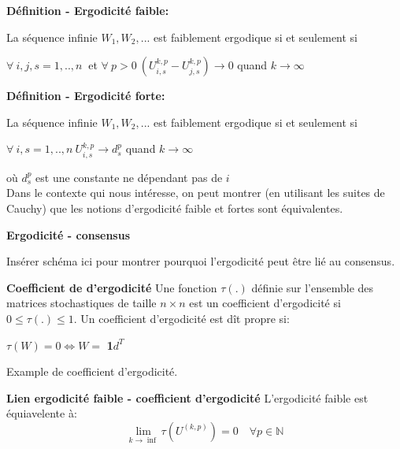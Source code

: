 \documentclass{beamer}
\begin{document}
\begin{frame}
	\textbf{Définition - Ergodicité faible:}
	
	La séquence infinie $W_1, W_2, ...$ est faiblement ergodique si et seulement si
	
	$ \forall\ i, j, s = 1,..,n\ $ et $\forall\ p > 0\ (U_{i,s}^{k,p} - U_{j,s}^{k,p}) \rightarrow 0$ quand $k \rightarrow \infty$
	
	\bigbreak

	\pause
	
	\textbf{Définition - Ergodicité forte:}
	
	La séquence infinie $W_1, W_2, ...$ est faiblement ergodique si et seulement si
	
	$ \forall\ i, s = 1,..,n\ U_{i,s}^{k,p} \rightarrow d_s^p$ quand $k \rightarrow \infty$
	
	où $d_s^p$ est une constante ne dépendant pas de $i$
	\\ 
	\vspace{1cm}
	\pause
	Dans le contexte qui nous intéresse, on peut montrer (en utilisant les suites de Cauchy) 
	que les notions d'ergodicité faible et fortes sont équivalentes.
	
\end{frame}


\begin{frame}
	\textbf{Ergodicité - consensus}

	Insérer schéma ici pour montrer pourquoi l'ergodicité peut être lié au consensus.
\end{frame}

\begin{frame}
	\textbf{Coefficient de d'ergodicité}
		Une fonction $\tau(.)$ définie sur l'ensemble des matrices stochastiques de taille $n \times n$ est un coefficient d'ergodicité si $0 \leq \tau(.) \leq 1$.
		\bigbreak
		\pause
		Un coefficient d'ergodicité est dît propre si:
		\begin{center}
			$\tau(W) = 0 \iff W = $ \textbf{1}$d^T$
		\end{center}
		\pause
		Example de coefficient d'ergodicité.
\end{frame}

\begin{frame}
	\textbf{Lien ergodicité faible - coefficient d'ergodicité}
	L'ergodicité faible est équiavelente à:
	\begin{equation}
		\nonumber
		\lim_{k \to \inf} \tau(U^{(k, p)}) = 0 \quad \forall p \in \mathbb{N} 
	\end{equation}
\end{frame}
\end{document}
